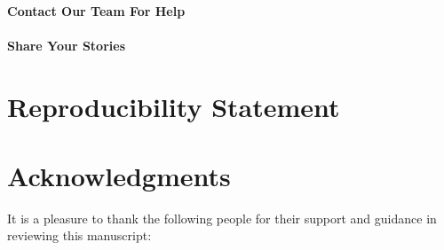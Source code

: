 \documentclass[12pt, a4paper,twoside]{report}
\theoremstyle{plain} %
\theoremstyle{definition} %
\theoremstyle{remark} %
\numberwithin{equation}{chapter}
\begin{document}
		\subsubsection{Contact Our Team For Help}
		
		\subsubsection{Share Your Stories}
		
		\chapter{Reproducibility Statement}\label{reproducibilitystatement}
		
		
		\chapter{Acknowledgments}
		It is a pleasure to thank the following people for their support and guidance in reviewing this manuscript:
		
		
		
		
		
		
		
	
\end{document}
